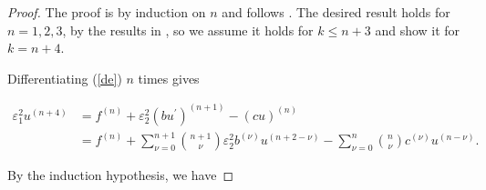 \documentclass[12pt]{article}
\begin{document}
\begin{proof}
%
The proof is by induction on $n$ and follows \cite{melenk}. The desired result holds for 
$n=1,2,3$, by the results in \cite{omalley, omalley2}, so we assume it holds for $k \le n+3$
and show it for $k=n+4$.

Differentiating (\ref{de}) $n$ times gives

$$
\begin{aligned}
\varepsilon_1^2 u^{(n+4)} & =f^{(n)}+\varepsilon_2^2\left(b u^{\prime}\right)^{(n+1)}-(c u)^{(n)} \\
& =f^{(n)}+\sum_{\nu=0}^{n+1}\binom{n+1}{\nu} \varepsilon_2^2 b^{(\nu)} u^{(n+2-\nu)}-\sum_{\nu=0}^n\binom{n}{\nu} c^{(\nu)} u^{(n-\nu)} .
\end{aligned}
$$

By the induction hypothesis, we have


\end{proof}
\end{document}
